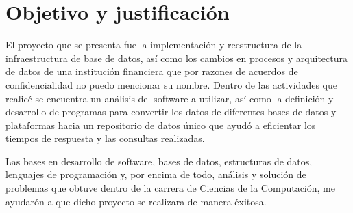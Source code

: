 \chapter*{Objetivo y justificación}
\label{cap:objetivo}

El proyecto que se presenta fue la implementación y reestructura de la
infraestructura de base de datos, así como los cambios en procesos y
arquitectura de datos de una institución financiera que por razones de acuerdos
de confidencialidad no puedo mencionar su nombre. Dentro de las actividades que
realicé se encuentra un análisis del software a utilizar, así como la definición
y desarrollo de programas para convertir los datos de diferentes bases de datos
y plataformas hacia un repositorio de datos único que ayudó a eficientar los
tiempos de respuesta y las consultas realizadas.

Las bases en desarrollo de software, bases de datos, estructuras de datos,
lenguajes de programación y, por encima de todo, análisis y solución de
problemas que obtuve dentro de la carrera de Ciencias de la Computación, me
ayudarón a que dicho proyecto se realizara de manera éxitosa.

\cleardoublepage

